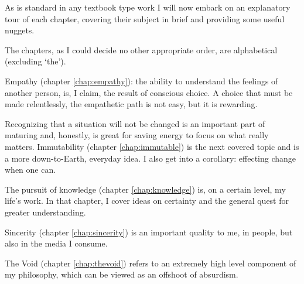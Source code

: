 \documentclass[./butidigress.tex]{subfiles}
\begin{document}
\label{sec:chapterrundown}
As is standard in any textbook type work I will now embark on an explanatory tour of each chapter, covering their subject in brief and providing some useful nuggets.

The chapters, as I could decide no other appropriate order, are alphabetical (excluding `the').

Empathy (chapter \ref{chap:empathy}): the ability to understand the feelings of another person, is, I claim, the result of conscious choice.
A choice that must be made relentlessly, the empathetic path is not easy, but it is rewarding.

Recognizing that a situation will not be changed is an important part of maturing and, honestly, is great for saving energy to focus on what really matters.
Immutability (chapter \ref{chap:immutable}) is the next covered topic and is a more down-to-Earth, everyday idea.
I also get into a corollary: effecting change when one can.

The pursuit of knowledge (chapter \ref{chap:knowledge}) is, on a certain level, my life's work.
In that chapter, I cover ideas on certainty and the general quest for greater understanding.

Sincerity (chapter \ref{chap:sincerity}) is an important quality to me, in people, but also in the media I consume.

The Void (chapter \ref{chap:thevoid}) refers to an extremely high level component of my philosophy, which can be viewed as an offshoot of absurdism.
\end{document}
